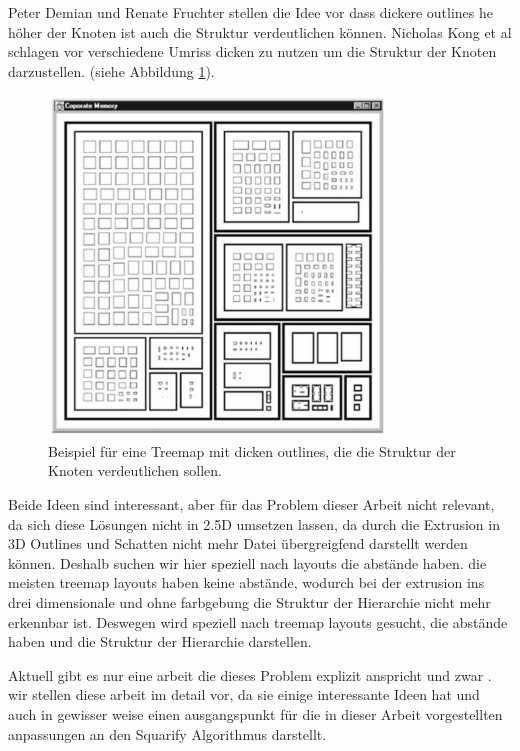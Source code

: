 Peter Demian und Renate Fruchter stellen die Idee vor dass dickere outlines he höher der Knoten ist auch die Struktur verdeutlichen können. 
Nicholas Kong et al schlagen vor verschiedene Umriss dicken zu nutzen um die Struktur der Knoten darzustellen.\cite{2010-perception-treemaps} (siehe Abbildung \ref{fig:thickOutline}).
\begin{figure}
    \centering
    \includegraphics[width=0.8\textwidth]{images/lineThickness.png}
    \caption{Beispiel für eine Treemap mit dicken outlines, die die Struktur der Knoten verdeutlichen sollen. \cite{2010-perception-treemaps}}
    \label{fig:thickOutline}
\end{figure}

Beide Ideen sind interessant, aber für das Problem dieser Arbeit nicht relevant, da sich diese Lösungen nicht in 2.5D umsetzen lassen, da durch die Extrusion in 3D Outlines und Schatten nicht mehr Datei übergreigfend darstellt werden können.
Deshalb suchen wir hier speziell nach layouts die abstände haben. die meisten treemap layouts haben keine abstände, wodurch bei der extrusion ins drei dimensionale und ohne farbgebung die Struktur der Hierarchie nicht mehr erkennbar ist. Deswegen wird speziell nach treemap layouts gesucht, die abstände haben und die Struktur der Hierarchie darstellen.

Aktuell gibt es nur eine arbeit die dieses Problem explizit anspricht und zwar \cite{lu2008cascaded}. wir stellen diese arbeit im detail vor, da sie einige interessante Ideen hat und auch in gewisser weise einen ausgangspunkt für die in dieser Arbeit vorgestellten anpassungen an den Squarify Algorithmus darstellt.

